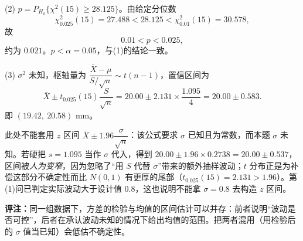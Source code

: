 (2) $p=P_{H_0}\{\chi^{2}(15)\geqslant28.125\}$。由给定分位数
\[
\chi^{2}_{0.025}(15)=27.488<28.125<\chi^{2}_{0.01}(15)=30.578 ,
\]
故
\[
0.01<p<0.025 ,
\]
约为 $0.021$。$p<\alpha=0.05$，与(1)的结论一致。

(3) $\sigma^{2}$ 未知，枢轴量为 $\dfrac{\bar X-\mu}{S/\sqrt{n}}\sim t(n-1)$，置信区间为
\[
\bar X\pm t_{0.025}(15)\frac{S}{\sqrt{n}}
=20.00\pm2.131\times\frac{1.095}{4}
=20.00\pm0.583 .
\]
即 $(19.42,\ 20.58)$ mm。

此处不能套用 $z$ 区间 $\bar X\pm1.96\dfrac{\sigma}{\sqrt{n}}$：该公式要求 $\sigma$ 已知且为常数，而本题 $\sigma$ 未知。若硬把 $s=1.095$ 当作 $\sigma$ 代入，得到 $20.00\pm1.96\times0.2738=20.00\pm0.537$，区间被\emph{人为变窄}，因为忽略了“用 $S$ 代替 $\sigma$”带来的额外抽样波动；$t$ 分布正是为补偿这部分不确定性而比 $N(0,1)$ 有更厚的尾部（$t_{0.025}(15)=2.131>1.96$）。第(1)问已判定实际波动大于设计值 $0.8$，这也说明不能拿 $\sigma=0.8$ 去构造 $z$ 区间。

\textbf{评注：}同一组数据下，方差的检验与均值的区间估计可以并存：前者说明“波动是否可控”，后者在承认波动未知的情况下给出均值的范围。把两者混用（用检验后的 $\sigma$ 值当已知）会低估不确定性。


\else \answerarea[10] \fi%
